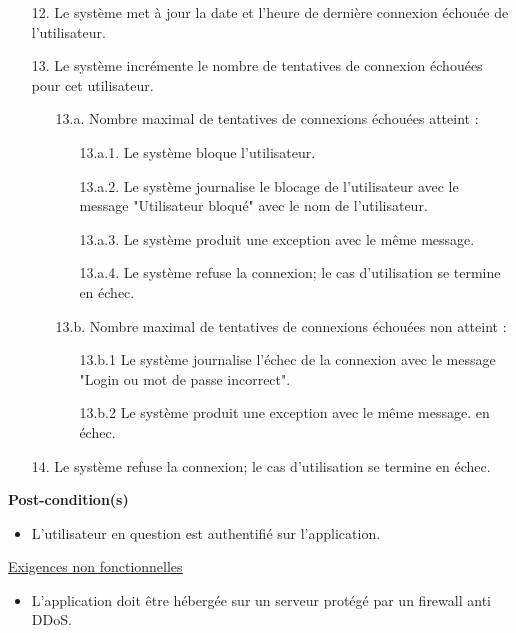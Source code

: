 \begin{itemize}
	\item[12.] Le système met à jour la date et l'heure de dernière connexion échouée de l'utilisateur.
	\item[13.] Le système incrémente le nombre de tentatives de connexion échouées pour cet utilisateur.
	\begin{itemize}
			\item[13.a.] Nombre maximal de tentatives de connexions échouées atteint :
			\begin{itemize}
				\item[13.a.1.] Le système bloque l'utilisateur.
				\item[13.a.2.] Le système journalise le blocage de l'utilisateur avec le message "Utilisateur bloqué" avec le nom de l'utilisateur.
				\item[13.a.3.] Le système produit une exception avec le même message.
				\item[13.a.4.] Le système refuse la connexion; le cas d'utilisation se termine en échec.
			\end{itemize}
			\item[13.b.] Nombre maximal de tentatives de connexions échouées non atteint :
			\begin{itemize}
				\item[13.b.1] Le système journalise l'échec de la connexion avec le message "Login ou mot de passe incorrect".
				\item[13.b.2] Le système produit une exception avec le même message. en échec.
			\end{itemize}
	\end{itemize}
	\item[14.] Le système refuse la connexion; le cas d'utilisation se termine en échec.
\end{itemize}
\textbf{Post-condition(s)}
\begin{itemize}
	\item L’utilisateur en question est authentifié sur l'application.
\end{itemize}
\underline{\underline{Exigences non fonctionnelles}}
\begin{itemize}
	\item L’application doit être hébergée sur un serveur protégé par un firewall anti DDoS.\\
\end{itemize}

